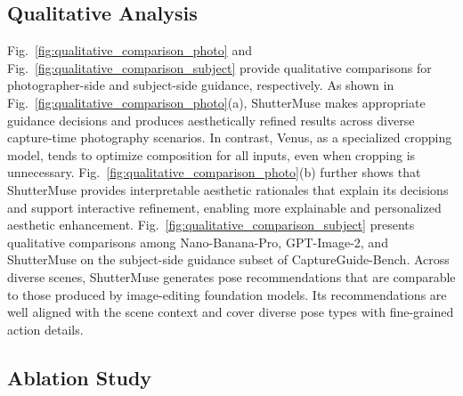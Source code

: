 \documentclass{article} %
\begin{document}
\subsection{Qualitative Analysis}

Fig.~\ref{fig:qualitative_comparison_photo} and Fig.~\ref{fig:qualitative_comparison_subject} provide qualitative comparisons for photographer-side and subject-side guidance, respectively. As shown in Fig.~\ref{fig:qualitative_comparison_photo}(a), ShutterMuse makes appropriate guidance decisions and produces aesthetically refined results across diverse capture-time photography scenarios. In contrast, Venus, as a specialized cropping model, tends to optimize composition for all inputs, even when cropping is unnecessary. Fig.~\ref{fig:qualitative_comparison_photo}(b) further shows that ShutterMuse provides interpretable aesthetic rationales that explain its decisions and support interactive refinement, enabling more explainable and personalized aesthetic enhancement. Fig.~\ref{fig:qualitative_comparison_subject} presents qualitative comparisons among Nano-Banana-Pro, GPT-Image-2, and ShutterMuse on the subject-side guidance subset of CaptureGuide-Bench. Across diverse scenes, ShutterMuse generates pose recommendations that are comparable to those produced by image-editing foundation models. Its recommendations are well aligned with the scene context and cover diverse pose types with fine-grained action details.
\subsection{Ablation Study}
\end{document}
